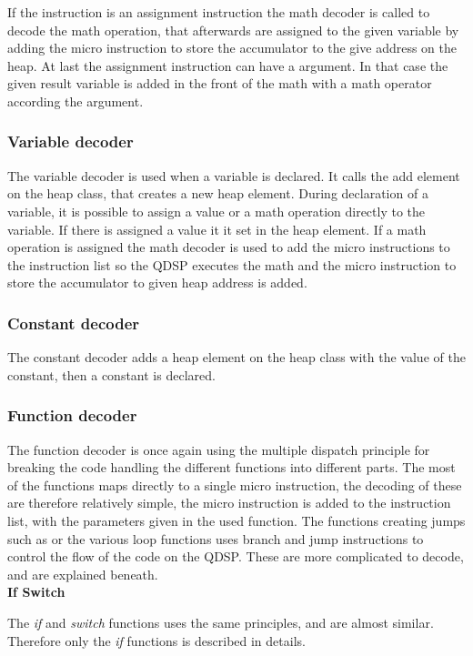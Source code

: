 If the instruction is an assignment instruction the math decoder is called to decode the math operation, that afterwards are assigned to the given variable by adding the micro instruction to store the accumulator to the give address on the heap. At last the assignment instruction can have a argument. In that case the given result variable is added in the front of the math with a math operator according the argument.

\subsubsection{Variable decoder}
The variable decoder is used when a variable is declared. It calls the add element on the heap class, that creates a new heap element. During declaration of a variable, it is possible to assign a value or a math operation directly to the variable. If there is assigned a value it it set in the heap element. If a math operation is assigned the math decoder is used to add the micro instructions to the instruction list so the QDSP executes the math and the micro instruction to store the accumulator to given heap address is added.

\subsubsection{Constant decoder}
The constant decoder adds a heap element on the heap class with the value of the constant, then a constant is declared. 

\subsubsection{Function decoder}
The function decoder is once again using the multiple dispatch principle for breaking the code handling the different functions into different parts. The most of the functions maps directly to a single micro instruction, the decoding of these are therefore relatively simple, the micro instruction is added to the instruction list, with the parameters given in the used function. The functions creating jumps such as  or the various loop functions uses branch and jump instructions to control the flow of the code on the QDSP. These are more complicated to decode, and are explained beneath.\\

\textbf{If Switch}

The \textit{if} and \textit{switch} functions uses the same principles, and are almost similar. Therefore only the \textit{if} functions is described in details.


